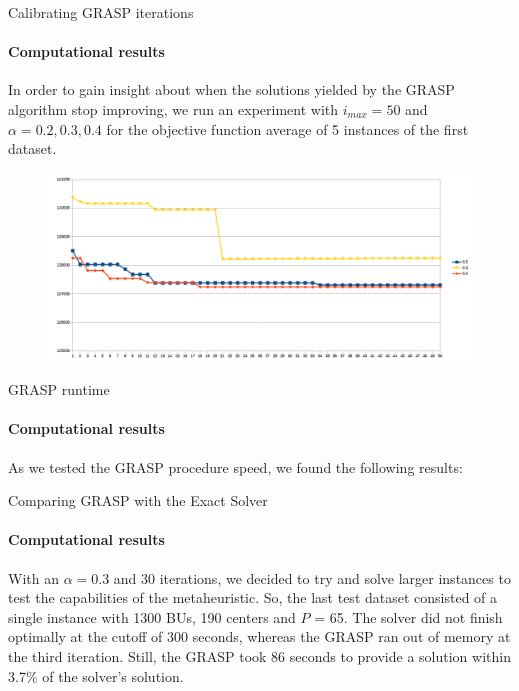 \documentclass{beamer}
\begin{document}
\begin{frame}{Calibrating GRASP iterations}
    \framesubtitle{Computational results}
    
    In order to gain insight about when the solutions yielded by the GRASP algorithm stop improving, we run an experiment with $i_{max} = 50$ and $\alpha = 0.2, 0.3, 0.4$ for the objective function average of 5 instances of the first dataset.
    
    \begin{figure}
        \centering
        \includegraphics[scale=0.3]{resultados_alfa}
    \end{figure}
\end{frame}

\begin{frame}{GRASP runtime}
    \framesubtitle{Computational results}
    As we tested the GRASP procedure speed, we found the following results:

    \begin{table}
        \centering
        \caption{Summary of the experiment results}
        \label{tab:grasp_optim_comp}
    \end{table}
   
\end{frame}

\begin{frame}{Comparing GRASP with the Exact Solver}
    \framesubtitle{Computational results}
    With an $\alpha = 0.3$ and 30 iterations, we decided to try and solve larger instances to test the capabilities of the metaheuristic. So, the last test dataset consisted of a single instance with 1300 BUs, 190 centers and $P$ = 65. The solver did not finish optimally at the cutoff of 300 seconds, whereas the GRASP ran out of memory at the third iteration. Still, the GRASP took 86 seconds to provide a solution within 3.7\% of the solver's solution.
\end{frame}
\end{document}
